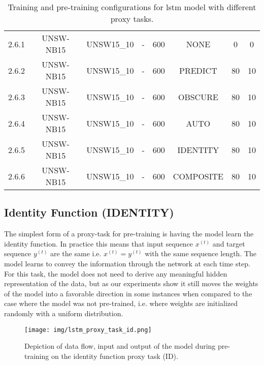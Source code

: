 \begin{table}[h]
{\begin{tabular}{cccccccc}
		2.6.1 \label{ex_2_6_1} & UNSW-NB15    & UNSW15\_10 & -           & 600           & NONE       & 0         & 0           \\
		2.6.2 \label{ex_2_6_2} & UNSW-NB15    & UNSW15\_10 & -           & 600           & PREDICT    & 80        & 10          \\
		2.6.3 \label{ex_2_6_3} & UNSW-NB15    & UNSW15\_10 & -           & 600           & OBSCURE      & 80        & 10          \\
		2.6.4 \label{ex_2_6_4} & UNSW-NB15    & UNSW15\_10 & -           & 600           & AUTO       & 80        & 10          \\
		2.6.5 \label{ex_2_6_5} & UNSW-NB15    & UNSW15\_10 & -           & 600           & IDENTITY   & 80        & 10          \\
		2.6.6 \label{ex_2_6_6} & UNSW-NB15    & UNSW15\_10 & -           & 600           & COMPOSITE  & 80        & 10         
	\end{tabular}}
	\caption{Training and pre-training configurations for \gls{lstm} model with different proxy tasks.}
	\label{table:experiments:lstm:configurations}
\end{table}

\subsection{Identity Function (IDENTITY)} \label{sec:experiments:lstm:identity}

The simplest form of a proxy-task for pre-training is having the model learn the identity function. In practice this means that input sequence $x^{(t)}$ and target sequence $y^{(t)}$ are the same i.e. $x^{(t)} = y^{(t)}$ with the same sequence length. The model learns to convey the information through the network at each time step. For this task, the model does not need to derive any meaningful hidden representation of the data, but as our experiments show it still moves the weights of the model into a favorable direction in some instances when compared to the case where the model was not pre-trained, i.e. where weights are initialized randomly with a uniform distribution.

\begin{figure}[h]
	\centering
	\texttt{[image: img/lstm\_proxy\_task\_id.png]}
	\caption{Depiction of data flow, input and output of the model during pre-training on the identity function proxy task (ID). }
	\label{fig:experiments:lstm_proxy_task_id}
\end{figure}

